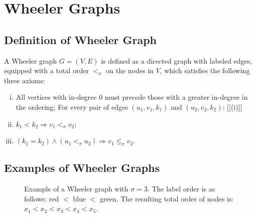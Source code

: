 \chapter{Wheeler Graphs}

\section{Definition of Wheeler Graph}

\begin{definition} \label{def_wheeler_graphs}
    A Wheeler graph $G=(V,E)$ is defined as a directed graph with labeled edges, equipped with a total order $<_{\pi}$ on the nodes in $V$, which satisfies the following three axioms:

    \begin{enumerate}[(i)]
        \item All vertices with in-degree $0$ must precede those with a greater in-degree in the ordering; \label{axiom_1}
    For every pair of edges $(u_1,v_1,k_1)$ and $(u_2,v_2,k_2)$:
    [{[(i)]}]
        \item $k_1<k_2 \Rightarrow v_1<_{\pi}v_2$; \label{axiom_2}
        \item $(k_1=k_2) \wedge (u_1<_{\pi}u_2) \Rightarrow v_1\leq_{\pi}v_2$. \label{axiom_3}
    \end{enumerate}
\end{definition}

\section{Examples of Wheeler Graphs}
\begin{figure}[H]
    \centering
    \caption[Example of a Wheeler Graph]{Example of a Wheeler graph with $\sigma=3$. The label order is as follows: red $<$ blue $<$ green. The resulting total order of nodes is: $x_1<x_2<x_3<x_4<x_5$.}
    \label{fig:wheeler_example}
\end{figure}

